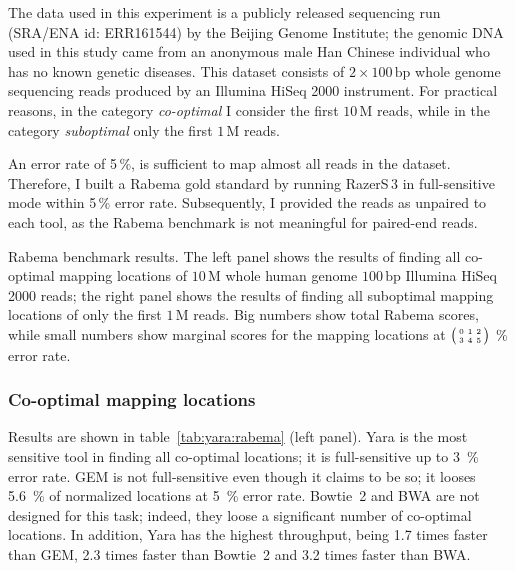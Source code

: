 The data used in this experiment is a publicly released sequencing run (SRA/ENA id: ERR161544) by the Beijing Genome Institute;
the genomic DNA used in this study came from an anonymous male Han Chinese individual who has no known genetic diseases.
This dataset consists of $2 \times 100\,\text{bp}$ whole genome sequencing reads produced by an Illumina HiSeq 2000 instrument.
For practical reasons, in the category \emph{co-optimal} I consider the first $10\,\text{M}$ reads, while in the category \emph{suboptimal} only the first $1\,\text{M}$ reads.

An error rate of 5\,\%, is sufficient to map almost all reads in the dataset.
Therefore, I built a Rabema gold standard by running RazerS\,3 in full-sensitive mode within 5\,\% error rate.
Subsequently, I provided the reads as unpaired to each tool, as the Rabema benchmark is not meaningful for paired-end reads.

\begin{table*}[t]
  \caption[Yara results in the Rabema benchmark]
  {
  \label{tab:yara:rabema}
    Rabema benchmark results.
    The left panel shows the results of finding all co-optimal mapping locations of $10\,\text{M}$ whole human genome $100\,\text{bp}$ Illumina HiSeq 2000 reads; the right panel shows the results of finding all suboptimal mapping locations of only the first $1\,\text{M}$ reads.
    Big numbers show total Rabema scores, while small numbers show marginal scores for the mapping locations at
    $\bigl(\begin{smallmatrix}\mbox{\tiny 0}&\mbox{\tiny 1}&\mbox{\tiny 2}\\\mbox{\tiny 3}&\mbox{\tiny 4}&\mbox{\tiny 5}\end{smallmatrix}\bigr)$ \% error rate.
    }
  \vspace{-3mm}
  \center
  \sffamily
  \resizebox{0.95\textwidth}{!}
  {
	\renewcommand{\tabcolsep}{0.8ex}
	
	
  }
\end{table*}

\subsubsection{Co-optimal mapping locations}
Results are shown in table~\ref{tab:yara:rabema} (left panel).
Yara is the most sensitive tool in finding all co-optimal locations; it is full-sensitive up to 3~\% error rate.
GEM is not full-sensitive even though it claims to be so; it looses 5.6~\% of normalized locations at 5~\% error rate.
Bowtie~2 and BWA are not designed for this task; indeed, they loose a significant number of co-optimal locations.
In addition, Yara has the highest throughput, being 1.7 times faster than GEM, 2.3 times faster than Bowtie~2 and 3.2 times faster than BWA.

